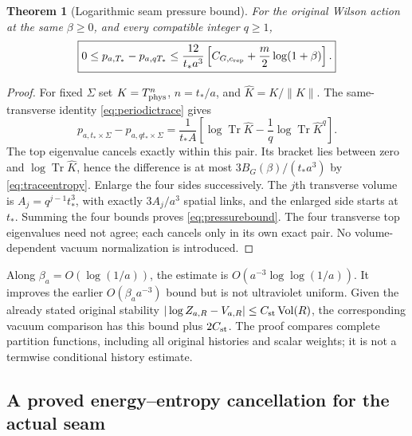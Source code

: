 \documentclass[11pt,letterpaper]{article}
\theoremstyle{plain}
\newtheorem{theorem}{Theorem}[section]
\theoremstyle{remark}\newtheorem{remark}[theorem]{Scope}
\DeclareMathOperator{\Tr}{Tr}\DeclareMathOperator{\Vol}{Vol}
\begin{document}
\begin{theorem}[Logarithmic seam pressure bound]
\label{thm:pressure}
For the original Wilson action at the same $\beta\ge0$, and every compatible
integer $q\ge1$,
\begin{equation}
\boxed{0\le p_{a,T_*}-p_{a,qT_*}
\le\frac{12}{t_*a^3}
\left[C_{G,c_{\rm rep}}+\frac m2\log(1+\beta)\right].}
\label{eq:pressurebound}
\end{equation}
\end{theorem}
\begin{proof}
For fixed $\Sigma$ set $K=T_{\rm phys}^{n}$, $n=t_*/a$, and
$\widehat K=K/\|K\|$. The same-transverse identity \eqref{eq:periodictrace} gives
\begin{equation}
p_{a,t_*\times\Sigma}-p_{a,qt_*\times\Sigma}
=\frac1{t_*A}\left[
\log\Tr\widehat K-\frac1q\log\Tr\widehat K^q\right].
\label{eq:rectangularpressure}
\end{equation}
The top eigenvalue cancels exactly within this pair. Its bracket lies between
zero and $\log\Tr\widehat K$, hence the difference is at most
$3B_G(\beta)/(t_*a^3)$ by \eqref{eq:traceentropy}.
Enlarge the four sides successively. The $j$th transverse volume is
$A_j=q^{j-1}t_*^3$, with exactly $3A_j/a^3$ spatial links, and the enlarged
side starts at $t_*$. Summing the four bounds proves \eqref{eq:pressurebound}.
The four transverse top eigenvalues need not agree; each cancels only in its
own exact pair. No volume-dependent vacuum normalization is introduced.
\end{proof}

Along $\beta_a=O(\log(1/a))$, the estimate is
$O(a^{-3}\log\log(1/a))$. It improves the earlier $O(\beta_a a^{-3})$ bound
but is not ultraviolet uniform. Given the already stated original stability
$|\log Z_{a,R}-V_{a,R}|\le C_{\rm st}\Vol(R)$, the corresponding vacuum
comparison has this bound plus $2C_{\rm st}$. The proof compares complete
partition functions, including all original histories and scalar weights;
it is not a termwise conditional history estimate.

\subsection{A proved energy--entropy cancellation for the actual seam}
\end{document}
